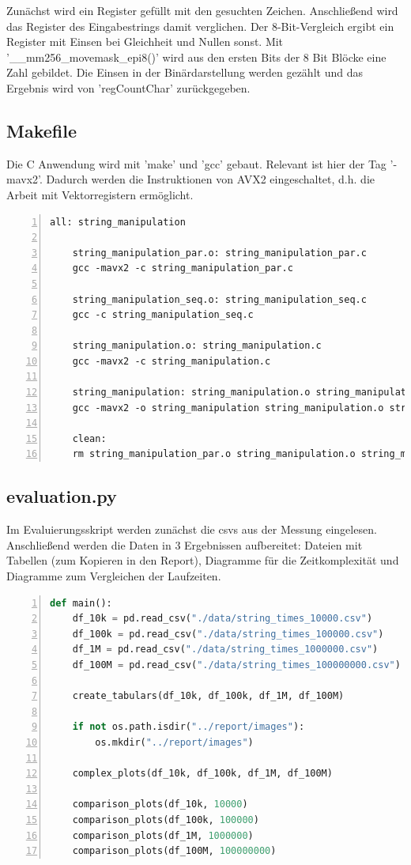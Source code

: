 \documentclass[plainarticle,zihtitle,german,final,hyperref,utf8]{zihpub}
\begin{document}
Zunächst wird ein Register gefüllt mit den gesuchten Zeichen. Anschließend wird das Register des Eingabestrings damit verglichen. Der 8-Bit-Vergleich ergibt ein Register mit Einsen bei Gleichheit und Nullen sonst. Mit '\_\_mm256\_movemask\_epi8()' wird aus den ersten Bits der 8 Bit Blöcke eine Zahl gebildet. Die Einsen in der Binärdarstellung werden gezählt und das Ergebnis wird von 'regCountChar' zurückgegeben.


\subsection{Makefile}
Die C Anwendung wird mit 'make' und 'gcc' gebaut. Relevant ist hier der Tag '-mavx2'. Dadurch werden die Instruktionen von AVX2 eingeschaltet, d.h. die Arbeit mit Vektorregistern ermöglicht.
\begin{lstlisting}[numbers=left]
	all: string_manipulation
	
	string_manipulation_par.o: string_manipulation_par.c
	gcc -mavx2 -c string_manipulation_par.c
	
	string_manipulation_seq.o: string_manipulation_seq.c
	gcc -c string_manipulation_seq.c
	
	string_manipulation.o: string_manipulation.c
	gcc -mavx2 -c string_manipulation.c
	
	string_manipulation: string_manipulation.o string_manipulation_par.o string_manipulation_seq.o
	gcc -mavx2 -o string_manipulation string_manipulation.o string_manipulation_seq.o string_manipulation_par.o
	
	clean:
	rm string_manipulation_par.o string_manipulation.o string_manipulation_seq.o string_manipulation
\end{lstlisting}

\subsection{evaluation.py}\label{subsec:eval}
Im Evaluierungsskript werden zunächst die csvs aus der Messung eingelesen.
Anschließend werden die Daten in 3 Ergebnissen aufbereitet: Dateien mit Tabellen (zum Kopieren in den Report), Diagramme für die Zeitkomplexität und Diagramme zum Vergleichen der Laufzeiten.

\begin{lstlisting}[language=python, numbers=left]
def main():
	df_10k = pd.read_csv("./data/string_times_10000.csv")
	df_100k = pd.read_csv("./data/string_times_100000.csv")
	df_1M = pd.read_csv("./data/string_times_1000000.csv")
	df_100M = pd.read_csv("./data/string_times_100000000.csv")

	create_tabulars(df_10k, df_100k, df_1M, df_100M)

	if not os.path.isdir("../report/images"):
		os.mkdir("../report/images")

	complex_plots(df_10k, df_100k, df_1M, df_100M)

	comparison_plots(df_10k, 10000)
	comparison_plots(df_100k, 100000)
	comparison_plots(df_1M, 1000000)
	comparison_plots(df_100M, 100000000)
\end{lstlisting}
\end{document}
